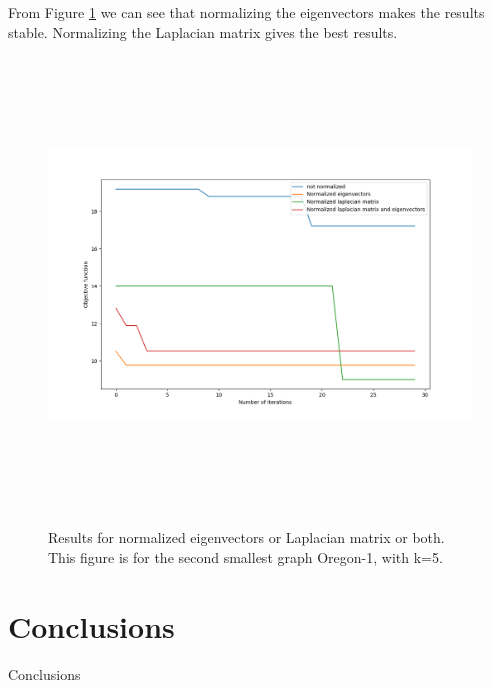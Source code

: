 \documentclass{article}
\begin{document}
From Figure \ref{normalized} we can see that normalizing the eigenvectors
makes the results stable. Normalizing the Laplacian matrix gives the best results.

\begin{figure}[htb]
\begin{center} \label{normalized}
\includegraphics[height=12cm]{normalization_plot-oregonk5.png}
\end{center}
\caption{Results for normalized eigenvectors or Laplacian matrix or both.
This figure is for the second smallest graph Oregon-1, with k=5.}
\end{figure}

\section{Conclusions}

Conclusions
\end{document}
